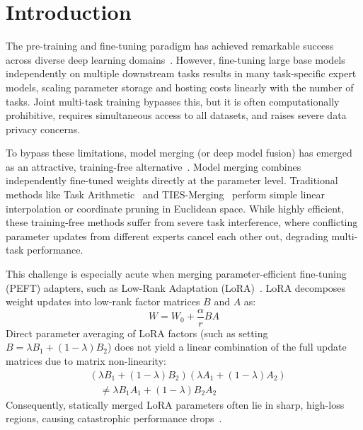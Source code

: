 \documentclass{article}
\theoremstyle{plain}
\theoremstyle{definition}
\theoremstyle{remark}
\begin{document}
\printAffiliationsAndNotice{} %

\section{Introduction}
\label{submission-introduction}

The pre-training and fine-tuning paradigm has achieved remarkable success across diverse deep learning domains~\cite{devlin2018bert, vaswani2017attention}. However, fine-tuning large base models independently on multiple downstream tasks results in many task-specific expert models, scaling parameter storage and hosting costs linearly with the number of tasks. Joint multi-task training bypasses this, but it is often computationally prohibitive, requires simultaneous access to all datasets, and raises severe data privacy concerns.

To bypass these limitations, model merging (or deep model fusion) has emerged as an attractive, training-free alternative~\cite{wortsman2022model, ilharco2022editing}. Model merging combines independently fine-tuned weights directly at the parameter level. Traditional methods like Task Arithmetic~\cite{ilharco2022editing} and TIES-Merging~\cite{yadav2023ties} perform simple linear interpolation or coordinate pruning in Euclidean space. While highly efficient, these training-free methods suffer from severe task interference, where conflicting parameter updates from different experts cancel each other out, degrading multi-task performance.

This challenge is especially acute when merging parameter-efficient fine-tuning (PEFT) adapters, such as Low-Rank Adaptation (LoRA)~\cite{hu2021lora}. LoRA decomposes weight updates into low-rank factor matrices $B$ and $A$ as:
\begin{equation}
  W = W_0 + \frac{\alpha}{r} BA
\end{equation}
Direct parameter averaging of LoRA factors (such as setting $B = \lambda B_1 + (1-\lambda) B_2$) does not yield a linear combination of the full update matrices due to matrix non-linearity:
\begin{equation}
\begin{split}
  &(\lambda B_1 + (1-\lambda) B_2)(\lambda A_1 + (1-\lambda) A_2) \\
  &\quad \neq \lambda B_1 A_1 + (1-\lambda) B_2 A_2
\end{split}
\end{equation}
Consequently, statically merged LoRA parameters often lie in sharp, high-loss regions, causing catastrophic performance drops~\cite{yadav2023ties}.
\end{document}

